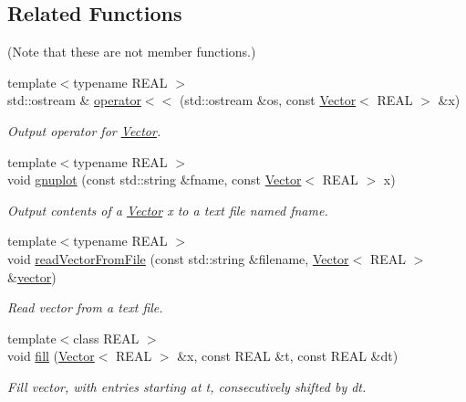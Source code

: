 \subsection*{Related Functions}
(Note that these are not member functions.) \begin{DoxyCompactItemize}
\item 
{\footnotesize template$<$typename REAL $>$ }\\std::ostream \& \hyperlink{classhdnum_1_1Vector_a50345eaaa46f20d031cc751aa35e4232}{operator$<$$<$} (std::ostream \&os, const \hyperlink{classhdnum_1_1Vector}{Vector}$<$ REAL $>$ \&x)
\begin{DoxyCompactList}\small\item\em Output operator for \hyperlink{classhdnum_1_1Vector}{Vector}. \item\end{DoxyCompactList}\item 
{\footnotesize template$<$typename REAL $>$ }\\void \hyperlink{classhdnum_1_1Vector_aa4e036b4657b6e29d60f6f6c6638f403}{gnuplot} (const std::string \&fname, const \hyperlink{classhdnum_1_1Vector}{Vector}$<$ REAL $>$ x)
\begin{DoxyCompactList}\small\item\em Output contents of a \hyperlink{classhdnum_1_1Vector}{Vector} x to a text file named fname. \item\end{DoxyCompactList}\item 
{\footnotesize template$<$typename REAL $>$ }\\void \hyperlink{classhdnum_1_1Vector_a4e37b684a0a8fec1d254c6dc142d34dd}{readVectorFromFile} (const std::string \&filename, \hyperlink{classhdnum_1_1Vector}{Vector}$<$ REAL $>$ \&\hyperlink{classstd_1_1vector}{vector})
\begin{DoxyCompactList}\small\item\em Read vector from a text file. \item\end{DoxyCompactList}\item 
{\footnotesize template$<$class REAL $>$ }\\void \hyperlink{classhdnum_1_1Vector_acc994daebde7d1e9699353a5672d5a92}{fill} (\hyperlink{classhdnum_1_1Vector}{Vector}$<$ REAL $>$ \&x, const REAL \&t, const REAL \&dt)
\begin{DoxyCompactList}\small\item\em Fill vector, with entries starting at t, consecutively shifted by dt. \item\end{DoxyCompactList}\item 

\end{DoxyCompactItemize}

